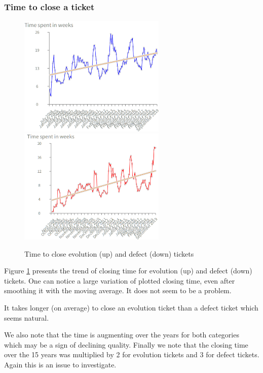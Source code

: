 \documentclass[10pt,conference]{IEEEtran}
\begin{document}
\subsubsection{Time to close a ticket}

\begin{figure}[htbp]
  \centering
  \includegraphics[width=70mm]{./images/openCloseEvol.png} \\
  \includegraphics[width=70mm]{./images/openCloseBug.png}
  \caption{Time to close evolution (up) and defect (down) tickets}
  \label{fig:closingTime}
\end{figure}

Figure \ref{fig:closingTime} presents the trend of closing time for evolution (up) and defect (down) tickets.
One can notice a large variation of plotted closing time, even after smoothing it with the moving average.
It does not seem to be a problem.

It takes longer (on average) to close an evolution ticket than a defect ticket which seems natural.

We also note that the time is augmenting over the years for both categories which may be a sign of declining quality.
Finally we note that the closing time over the 15 years was multiplied by 2 for evolution tickets and 3 for defect tickets.
Again this is an issue to investigate.
\end{document}
